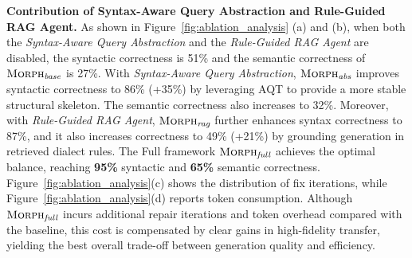 \documentclass[sigconf,review,anonymous]{acmart}
\begin{document}
\textbf{Contribution of Syntax-Aware Query Abstraction and Rule-Guided RAG Agent. }
As shown in Figure~\ref{fig:ablation_analysis} (a) and (b), when both the \textit{Syntax-Aware Query Abstraction} and the \textit{Rule-Guided RAG Agent} are disabled, the syntactic correctness is 51\% and the semantic correctness of $\textsc{Morph}{}_{\textit{base}}$ is 27\%.
With \textit{Syntax-Aware Query Abstraction}, $\textsc{Morph}{}_{\textit{abs}}$ improves syntactic correctness to 86\% (+35\%) by leveraging AQT to provide a more stable structural skeleton. The semantic correctness also increases to 32\%.
Moreover, with \textit{Rule-Guided RAG Agent}, $\textsc{Morph}{}_{\textit{rag}}$ further enhances syntax correctness to 87\%, and it also increases correctness to 49\% (+21\%) by grounding generation in retrieved dialect rules.
The Full framework $\textsc{Morph}{}_{\textit{full}}$ achieves the optimal balance, reaching \textbf{95\%} syntactic and \textbf{65\%} semantic correctness.
Figure~\ref{fig:ablation_analysis}(c) shows the distribution of fix iterations, while Figure~\ref{fig:ablation_analysis}(d) reports token consumption. Although $\textsc{Morph}{}_{\textit{full}}$ incurs additional repair iterations and token overhead compared with the baseline, this cost is compensated by clear gains in high-fidelity transfer, yielding the best overall trade-off between generation quality and efficiency.




\end{document}
